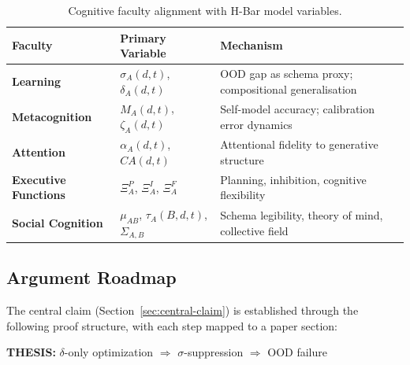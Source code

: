 \documentclass[11pt,a4paper]{article}
\begin{document}
\begin{table}[htbp]
\centering
\caption{Cognitive faculty alignment with H-Bar model variables.}
\label{tab:faculty-alignment}
\begin{tabular}{>{\raggedright}p{3.2cm} >{\raggedright}p{3.5cm} >{\raggedright\arraybackslash}p{7cm}}
\toprule
\textbf{Faculty} & \textbf{Primary Variable} & \textbf{Mechanism} \\
\midrule
\textbf{Learning} & $\sigma_A(d,t)$, $\delta_A(d,t)$ & OOD gap as schema proxy; compositional generalisation \\
\textbf{Metacognition} & $\hat M_A(d,t)$, $\zeta_A(d,t)$ & Self-model accuracy; calibration error dynamics \\
\textbf{Attention} & $\alpha_A(d,t)$, $CA(d,t)$ & Attentional fidelity to generative structure \\
\textbf{Executive Functions} & $\Xi_A^P$, $\Xi_A^I$, $\Xi_A^F$ & Planning, inhibition, cognitive flexibility \\
\textbf{Social Cognition} & $\mu_{AB}$, $\tau_A(B,d,t)$, $\Sigma_{A,B}$ & Schema legibility, theory of mind, collective field \\
\bottomrule
\end{tabular}
\end{table}

\subsection{Argument Roadmap}\label{sec:argument-roadmap}

The central claim (Section~\ref{sec:central-claim}) is established through the
following proof structure, with each step mapped to a paper section:

\textbf{THESIS:} $\delta$-only optimization $\Rightarrow$ $\sigma$-suppression $\Rightarrow$ OOD failure
\end{document}
